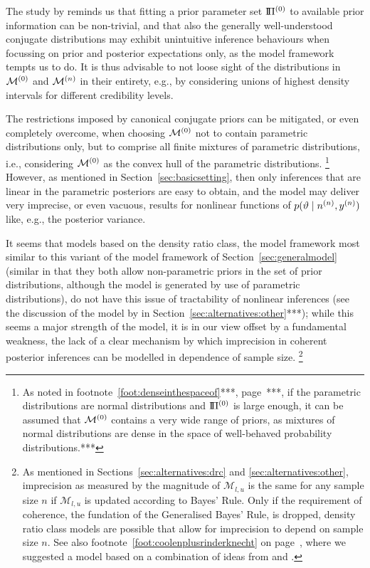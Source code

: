 The study by \textcite[see the discussion in Section~\ref{sec:alternatives:other}***]{2011:krautenbacher}
reminds us that fitting a prior parameter set $\text{I}\!\Pi^{(0)}$
to available prior information can be non-trivial,
and that also the generally well-understood conjugate distributions may exhibit
unintuitive inference behaviours when focussing on prior and posterior expectations only,
as the model framework tempts us to do.
It is thus advisable to not loose sight of the distributions in $\mathcal{M}^{(0)}$ and $\mathcal{M}^{(n)}$ in their entirety, %
e.g., by considering unions of highest density intervals for different credibility levels.

The restrictions imposed by canonical conjugate priors can be mitigated,
or even completely overcome,
when choosing $\mathcal{M}^{(0)}$ not to contain parametric distributions only,
but to comprise all finite mixtures of parametric distributions,
i.e., considering $\mathcal{M}^{(0)}$ as the convex hull of the parametric distributions.%
\footnote{As noted in footnote~\ref{foot:denseinthespaceof}***, page~\pageref{foot:denseinthespaceof}***,
if the parametric distributions are normal distributions and $\text{I}\!\Pi^{(0)}$ is large enough,
it can be assumed that $\mathcal{M}^{(0)}$ contains a very wide range of priors,
as mixtures of normal distributions are dense in the space of well-behaved probability distributions.***}
However, as mentioned in Section~\ref{sec:basicsetting},
then only inferences that are linear in the parametric posteriors are easy to obtain,
and the model may deliver very imprecise, or even vacuous, results
for nonlinear functions of $p(\vartheta\mid n^{(n)},y^{(n)})$ like, e.g., the posterior variance.

It seems that models based on the density ratio class,
the model framework most similar to this variant of the model framework of Section~\ref{sec:generalmodel}
(similar in that they both allow non-parametric priors in the set of prior distributions,
although the model is generated by use of parametric distributions),
do not have this issue of tractability of nonlinear inferences
(see the discussion of the model by \textcite[\S 4]{2011:rinderknecht} in Section~\ref{sec:alternatives:other}***);
while this seems a major strength of the model,
it is in our view offset by a fundamental weakness,
the lack of a clear mechanism by which imprecision in coherent posterior inferences
can be modelled in dependence of sample size.%
\footnote{As mentioned in Sections~\ref{sec:alternatives:drc} and \ref{sec:alternatives:other},
imprecision as measured by the magnitude of $\mathcal{M}_{l,u}$ is the same for any sample size $n$
if $\mathcal{M}_{l,u}$ is updated according to Bayes' Rule.
Only if the requirement of coherence, the fundation of the Generalised Bayes' Rule, is dropped,
density ratio class models are possible that allow for imprecision to depend on sample size $n$.
See also footnote~\ref{foot:coolenplusrinderknecht} on page~\pageref{foot:coolenplusrinderknecht},
where we suggested a model based on a combination of ideas from \textcite{1993:coolen} and \textcite{2011:rinderknecht:diss}.}

